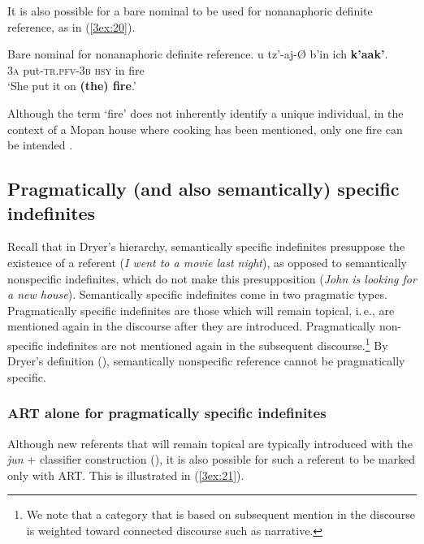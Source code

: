 \documentclass[output=paper]{langsci/langscibook}
\begin{document}
It is also possible for a bare nominal to be used for nonanaphoric definite reference, as in (\ref{3ex:20}).

\begin{exe}
\ex\label{3ex:20}
Bare nominal for nonanaphoric definite reference. 
\exi{}
\gll	u		tz'-aj-{\O}			b'in 			ich 	{\textbf{k'aak'}}. \\
	{\textsc{3a}}	put-{\textsc{tr.pfv-3b}}	{\textsc{hsy}}		in	fire \\
\glt	`She put it on {\textbf{(the) fire}}.'
\end{exe}
	
Although the term `fire' does not inherently identify a unique individual, in the context of a Mopan house where cooking has been mentioned, only one fire can be intended \citep[see, e.\,g.,][285]{lobner:11}.


\subsection{Pragmatically (and also semantically) specific indefinites}\label{3sec:33}

Recall that in Dryer's hierarchy, semantically specific indefinites presuppose the existence of a referent ({\emph{I went to a movie last night}}), as opposed to semantically nonspecific indefinites, which do not make this presupposition ({\emph{John is looking for a new house}}). Semantically specific indefinites come in two pragmatic types. Pragmatically specific indefinites are those which will remain topical, i.\,e., are mentioned again in the discourse after they are introduced. Pragmatically non-specific indefinites are not mentioned again in the subsequent discourse.\footnote{We note that a category that is based on subsequent mention in the discourse is weighted toward connected discourse such as narrative.} By Dryer's definition (\citeyear[][e237]{dryer:14}), semantically nonspecific reference cannot be pragmatically specific.

\subsubsection{ART alone for pragmatically specific indefinites}\label{3sec:331}

Although new referents that will remain topical are typically introduced with the {\emph{jun}} + classifier construction (), it is also possible for such a referent to be marked only with ART.  This is illustrated in (\ref{3ex:21}).
\end{document}
